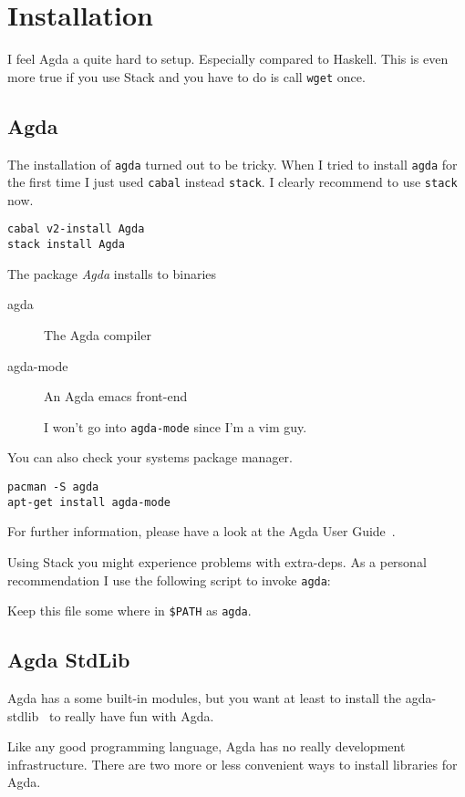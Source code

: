 \documentclass[12pt]{article}
\begin{document}
\section{Installation}
I feel Agda a quite hard to setup. Especially compared to Haskell. This is even
more true if you use Stack and you have to do is call \verb+wget+ once.

\subsection{Agda}
The installation of \verb+agda+ turned out to be tricky.
When I tried to install \verb+agda+ for the first time I just used \verb+cabal+
instead \verb+stack+. I clearly recommend to use \verb+stack+ now.

\begin{lstlisting}
cabal v2-install Agda
stack install Agda
\end{lstlisting}

The package \emph{Agda} installs to binaries

\begin{description}
	\item[agda] The Agda compiler
	\item[agda-mode] An Agda emacs front-end

		I won't go into \verb+agda-mode+ since I'm a vim guy.
\end{description}

You can also check your systems package manager.
\begin{lstlisting}
pacman -S agda
apt-get install agda-mode
\end{lstlisting}

For further information, please have a look at the Agda User
Guide~\cite{agda-user-guide}.

Using Stack you might experience problems with extra-deps. As a personal
recommendation I use the following script to invoke \verb+agda+:

Keep this file some where in \verb+$PATH+ as \verb+agda+.

\subsection{Agda StdLib}
Agda has a some built-in modules, but you want at least to install
the agda-stdlib~\cite{agda-stdlib} to really have fun with Agda.

Like any good programming language, Agda has no really development
infrastructure. There are two more or less convenient ways to install
libraries for Agda.
\end{document}

